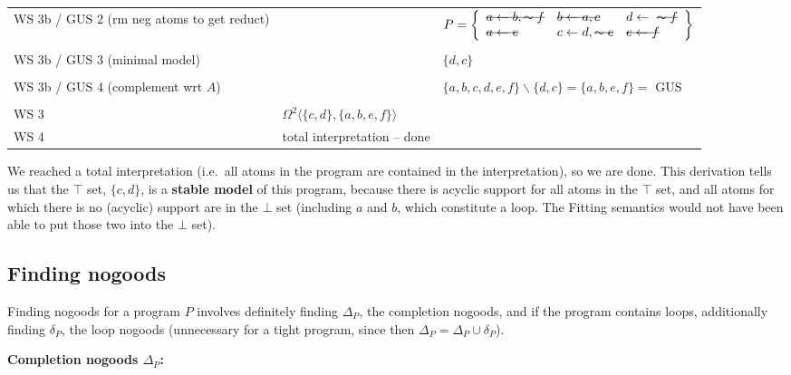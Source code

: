 \documentclass[9pt,a4paper,landscape]{article}
\newcommand{\msout}[1]{\text{\sout{$#1$}}}
\begin{document}
{\begin{center}
\begin{tabular}{p{5cm}p{5cm}p{7cm}}
		WS 3b / GUS 2 (rm neg atoms to get reduct) 
		& 
		& $P = \left\{\begin{array}{lll}
		\msout{a \leftarrow b, \sim f} & \msout{b \leftarrow a, c} & d \leftarrow\ \msout{\sim f}\\
		\msout{a \leftarrow e} & c \leftarrow d, \msout{\sim e} & \msout{e \leftarrow f}
		\end{array}\right\}$ \\ &\\
		WS 3b / GUS 3 (minimal model) 
		& 
		& $\{ d, c \}$ \\ &\\
		WS 3b / GUS 4 (complement wrt $A$) 
		&
		&  $\{a, b, c, d, e, f\} \backslash \{d, c\} = \{a, b, e, f\} = $ GUS  \\&\\
		WS 3 
		& $\Omega^2 \langle \{c, d\}, \{a, b, e, f\} \rangle$& \\ \midrule
		WS 4 & total interpretation -- done & \\ \midrule
	\end{tabular}
\end{center}

We reached a total interpretation (i.e.\ all atoms in the program are contained in the interpretation), so we are done.
This derivation tells us that the $\top$ set, $\{c, d\}$, is a \textbf{stable model} of this program, because there is acyclic support for all atoms in the $\top$ set, and all atoms for which there is no (acyclic) support are in the $\bot$ set (including $a$ and $b$, which constitute a loop. The Fitting semantics would not have been able to put those two into the $\bot$ set).

\pagebreak


\subsection{Finding nogoods}
\label{subsec:ng}

Finding nogoods for a program $P$ involves definitely finding $\Delta_P$, the completion nogoods, and if the program contains loops, additionally finding $\delta_P$, the loop nogoods (unnecessary for a tight program, since then $\Delta_P = \Delta_P \cup \delta_P$).

\vspace{\baselineskip}
\textbf{Completion nogoods $\Delta_P$:}

}
\end{document}
